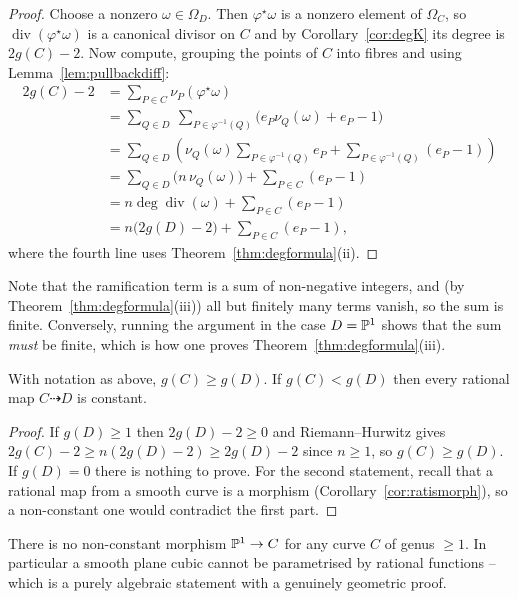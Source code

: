 \documentclass[a4paper]{scrartcl}
\newcommand{\dto}{\dashrightarrow}
\DeclareMathOperator{\Divv}{div}
\begin{document}
\begin{proof}
	Choose a nonzero $\omega \in \Omega_D$. Then $\varphi^\star\omega$ is a nonzero element of $\Omega_C$, so $\Divv(\varphi^\star\omega)$ is a canonical divisor on $C$ and by Corollary~\ref{cor:degK} its degree is $2g(C)-2$. Now compute, grouping the points of $C$ into fibres and using Lemma~\ref{lem:pullbackdiff}:
	\begin{align*}
		2g(C)-2 &= \sum_{P\in C}\nu_P(\varphi^\star\omega)\\
		&= \sum_{Q\in D}\ \sum_{P \in \varphi^{-1}(Q)}\big(e_P\nu_Q(\omega) + e_P-1\big)\\
		&= \sum_{Q\in D}\left(\nu_Q(\omega)\sum_{P\in\varphi^{-1}(Q)}e_P + \sum_{P\in\varphi^{-1}(Q)}(e_P-1)\right)\\
		&= \sum_{Q\in D}\Big(n\,\nu_Q(\omega)\Big) + \sum_{P \in C}(e_P-1)\\
		&= n\deg\Divv(\omega) + \sum_{P\in C}(e_P-1)\\
		&= n\big(2g(D)-2\big) + \sum_{P\in C}(e_P-1),
	\end{align*}
	where the fourth line uses Theorem~\ref{thm:degformula}(ii).
\end{proof}

Note that the ramification term is a sum of non-negative integers, and (by Theorem~\ref{thm:degformula}(iii)) all but finitely many terms vanish, so the sum is finite. Conversely, running the argument in the case $D = \mathbb{P}^1$ shows that the sum \emph{must} be finite, which is how one proves Theorem~\ref{thm:degformula}(iii).

\begin{corollary}\label{cor:genusincrease}
	With notation as above, $g(C) \geq g(D)$. If $g(C) < g(D)$ then every rational map $C \dto D$ is constant.
\end{corollary}

\begin{proof}
	If $g(D) \geq 1$ then $2g(D)-2\geq 0$ and Riemann--Hurwitz gives $2g(C)-2 \geq n(2g(D)-2)\geq 2g(D)-2$ since $n\geq1$, so $g(C)\geq g(D)$. If $g(D) = 0$ there is nothing to prove. For the second statement, recall that a rational map from a smooth curve is a morphism (Corollary~\ref{cor:ratismorph}), so a non-constant one would contradict the first part.
\end{proof}

\begin{example}
	There is no non-constant morphism $\mathbb{P}^1 \to C$ for any curve $C$ of genus $\geq 1$. In particular a smooth plane cubic cannot be parametrised by rational functions -- which is a purely algebraic statement with a genuinely geometric proof.
\end{example}
\end{document}

